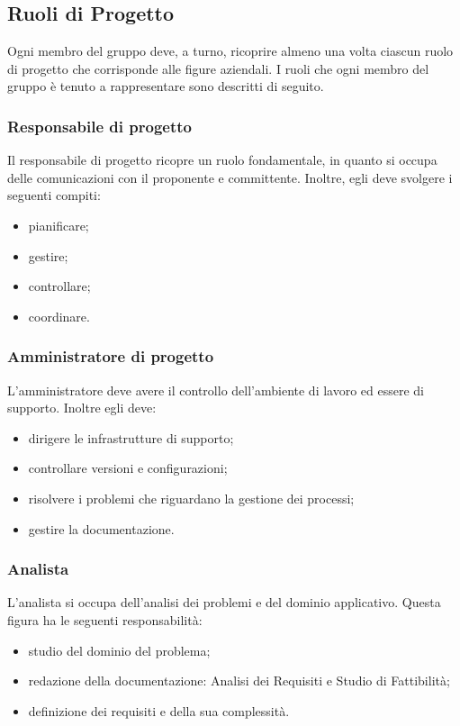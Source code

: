 \subsection{Ruoli di Progetto}
Ogni membro del gruppo deve, a turno, ricoprire almeno una volta ciascun ruolo di progetto che corrisponde alle figure aziendali. I ruoli che ogni membro del gruppo è tenuto a rappresentare sono descritti di seguito.



\subsubsection{Responsabile di progetto}
Il responsabile di progetto ricopre un ruolo fondamentale, in quanto si occupa delle comunicazioni con il proponente e committente. Inoltre, egli deve svolgere i seguenti compiti:
\begin{itemize}
\item pianificare;
\item gestire;
\item controllare;
\item coordinare.
\end{itemize}

\subsubsection{Amministratore di progetto}
L'amministratore deve avere il controllo dell'ambiente di lavoro ed essere di supporto. Inoltre egli deve: 
\begin{itemize}
\item dirigere le infrastrutture di supporto;
\item controllare versioni e configurazioni;
\item risolvere i problemi che riguardano la gestione dei processi;
\item gestire la documentazione.
\end{itemize}


\subsubsection{Analista}
L'analista si occupa dell'analisi dei problemi e del dominio applicativo. Questa figura ha le seguenti responsabilità:
\begin{itemize}
\item studio del dominio del problema; 
\item redazione della documentazione: Analisi dei Requisiti e Studio di Fattibilità;
\item definizione dei requisiti e della sua complessità.
\end{itemize}
